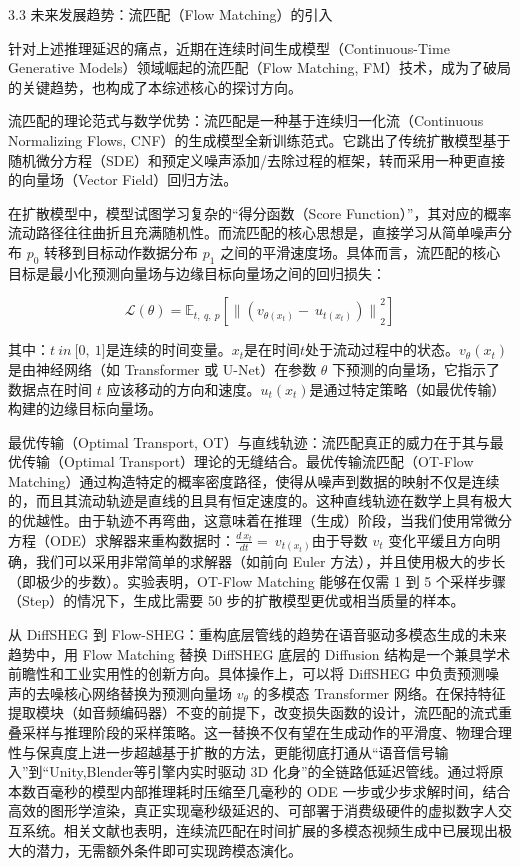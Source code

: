 \documentclass[UTF8]{ctexart}
\begin{document}
3.3 未来发展趋势：流匹配（Flow Matching）的引入

针对上述推理延迟的痛点，近期在连续时间生成模型（Continuous-Time Generative Models）领域崛起的流匹配（Flow Matching, FM）技术，成为了破局的关键趋势，也构成了本综述核心的探讨方向。

流匹配的理论范式与数学优势：流匹配是一种基于连续归一化流（Continuous Normalizing Flows, CNF）的生成模型全新训练范式。它跳出了传统扩散模型基于随机微分方程（SDE）和预定义噪声添加/去除过程的框架，转而采用一种更直接的向量场（Vector Field）回归方法。

在扩散模型中，模型试图学习复杂的``得分函数（Score Function）''，其对应的概率流动路径往往曲折且充满随机性。而流匹配的核心思想是，直接学习从简单噪声分布 \(p_{0}\) 转移到目标动作数据分布 \(p_{1}\) 之间的平滑速度场。具体而言，流匹配的核心目标是最小化预测向量场与边缘目标向量场之间的回归损失：

\[\mathcal{L}(\theta) = \mathbb{E}_{t,\ q,\ p}\left\lbrack \|{\left( v_{\theta\left( x_{t} \right)} - \ u_{t\left( x_{t} \right)} \right)\|}_{2}^{2} \right\rbrack\]

其中：\(t\ in\ \lbrack 0,\ 1\rbrack\)是连续的时间变量。\(x_{t}\)是在时间\(t\)处于流动过程中的状态。\(v_{\theta}\left( x_{t} \right)\) 是由神经网络（如 Transformer 或 U-Net）在参数 \(\theta\) 下预测的向量场，它指示了数据点在时间 \(t\) 应该移动的方向和速度。\(u_{t}\left( x_{t} \right)\)是通过特定策略（如最优传输）构建的边缘目标向量场。

最优传输（Optimal Transport, OT）与直线轨迹：流匹配真正的威力在于其与最优传输（Optimal Transport）理论的无缝结合。最优传输流匹配（OT-Flow Matching）通过构造特定的概率密度路径，使得从噪声到数据的映射不仅是连续的，而且其流动轨迹是直线的且具有恒定速度的。这种直线轨迹在数学上具有极大的优越性。由于轨迹不再弯曲，这意味着在推理（生成）阶段，当我们使用常微分方程（ODE）求解器来重构数据时：\(\frac{d\ x_{t}}{dt} = \ v_{t\left( x_{t} \right)}\)由于导数 \(v_{t}\) 变化平缓且方向明确，我们可以采用非常简单的求解器（如前向 Euler 方法），并且使用极大的步长（即极少的步数）。实验表明，OT-Flow Matching 能够在仅需 1 到 5 个采样步骤（Step）的情况下，生成比需要 50 步的扩散模型更优或相当质量的样本。

从 DiffSHEG 到 Flow-SHEG：重构底层管线的趋势在语音驱动多模态生成的未来趋势中，用 Flow Matching 替换 DiffSHEG 底层的 Diffusion 结构是一个兼具学术前瞻性和工业实用性的创新方向。具体操作上，可以将 DiffSHEG 中负责预测噪声的去噪核心网络替换为预测向量场 \(v_{\theta}\) 的多模态 Transformer 网络。在保持特征提取模块（如音频编码器）不变的前提下，改变损失函数的设计，流匹配的流式重叠采样与推理阶段的采样策略。这一替换不仅有望在生成动作的平滑度、物理合理性与保真度上进一步超越基于扩散的方法，更能彻底打通从``语音信号输入''到``Unity,Blender等引擎内实时驱动 3D 化身''的全链路低延迟管线。通过将原本数百毫秒的模型内部推理耗时压缩至几毫秒的 ODE 一步或少步求解时间，结合高效的图形学渲染，真正实现毫秒级延迟的、可部署于消费级硬件的虚拟数字人交互系统。相关文献也表明，连续流匹配在时间扩展的多模态视频生成中已展现出极大的潜力，无需额外条件即可实现跨模态演化。
\end{document}
